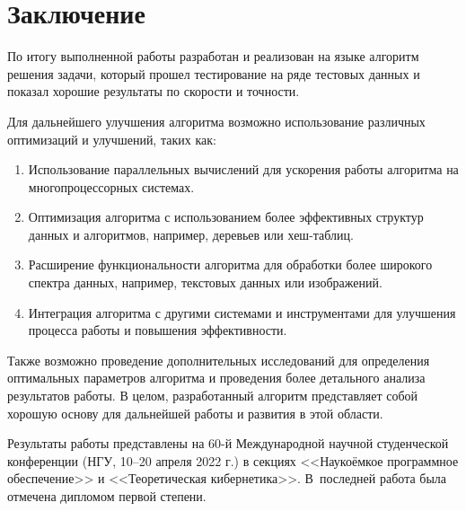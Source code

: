\section*{Заключение}


По итогу выполненной работы разработан и реализован на языке \CPP{} алгоритм решения задачи, который прошел тестирование на ряде тестовых данных и показал хорошие результаты по скорости и точности.

Для дальнейшего улучшения алгоритма возможно использование различных оптимизаций и улучшений, таких как:
\begin{enumerate}
    \item Использование параллельных вычислений для ускорения работы алгоритма на многопроцессорных системах.
    \item Оптимизация алгоритма с использованием более эффективных структур данных и алгоритмов, например, деревьев или хеш-таблиц.
    \item Расширение функциональности алгоритма для обработки более широкого спектра данных, например, текстовых данных или изображений.
    \item Интеграция алгоритма с другими системами и инструментами для улучшения процесса работы и повышения эффективности.
\end{enumerate}

Также возможно проведение дополнительных исследований для определения оптимальных параметров алгоритма и проведения более детального анализа результатов работы. В целом, разработанный алгоритм представляет собой хорошую основу для дальнейшей работы и развития в этой области.


Результаты работы представлены на 60-й Международной научной студенческой конференции (НГУ, 10--20 апреля 2022 г.) в секциях <<Наукоёмкое программное обеспечение>> и <<Теоретическая кибернетика>>. 
В~последней работа была отмечена дипломом первой степени.